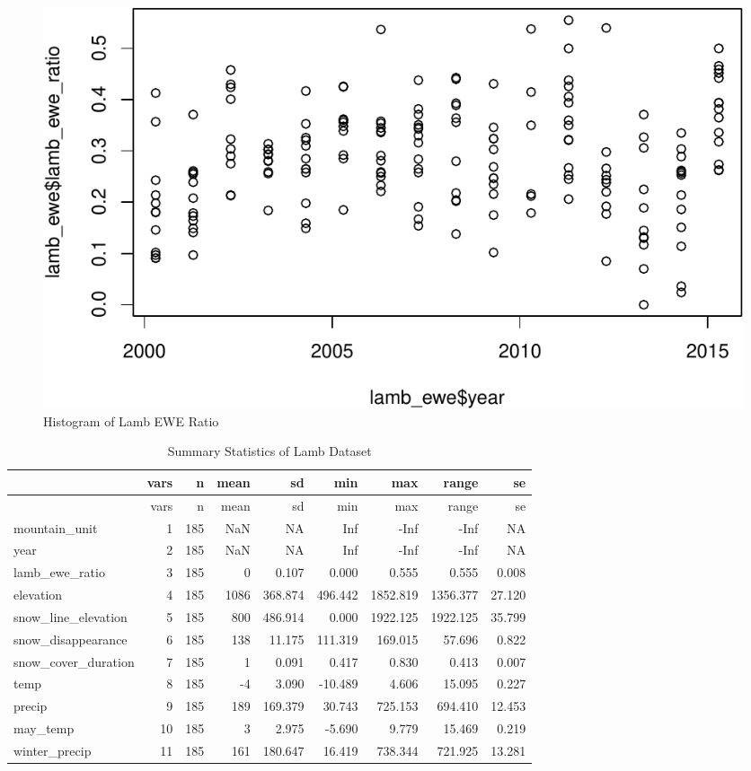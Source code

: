 \documentclass[
  12pt,
]{article}
\begin{document}
\begin{figure}
\centering
\includegraphics{Final-Report_files/figure-latex/unnamed-chunk-3-1.pdf}
\caption{Histogram of Lamb EWE Ratio}
\end{figure}

\begin{longtable}[]{@{}lrrrrrrrr@{}}
\caption{Summary Statistics of Lamb Dataset}\tabularnewline
\toprule
& vars & n & mean & sd & min & max & range & se \\
\midrule
\endfirsthead
\toprule
& vars & n & mean & sd & min & max & range & se \\
\midrule
\endhead
mountain\_unit & 1 & 185 & NaN & NA & Inf & -Inf & -Inf & NA \\
year & 2 & 185 & NaN & NA & Inf & -Inf & -Inf & NA \\
lamb\_ewe\_ratio & 3 & 185 & 0 & 0.107 & 0.000 & 0.555 & 0.555 &
0.008 \\
elevation & 4 & 185 & 1086 & 368.874 & 496.442 & 1852.819 & 1356.377 &
27.120 \\
snow\_line\_elevation & 5 & 185 & 800 & 486.914 & 0.000 & 1922.125 &
1922.125 & 35.799 \\
snow\_disappearance & 6 & 185 & 138 & 11.175 & 111.319 & 169.015 &
57.696 & 0.822 \\
snow\_cover\_duration & 7 & 185 & 1 & 0.091 & 0.417 & 0.830 & 0.413 &
0.007 \\
temp & 8 & 185 & -4 & 3.090 & -10.489 & 4.606 & 15.095 & 0.227 \\
precip & 9 & 185 & 189 & 169.379 & 30.743 & 725.153 & 694.410 &
12.453 \\
may\_temp & 10 & 185 & 3 & 2.975 & -5.690 & 9.779 & 15.469 & 0.219 \\
winter\_precip & 11 & 185 & 161 & 180.647 & 16.419 & 738.344 & 721.925 &
13.281 \\
\bottomrule
\end{longtable}
\end{document}
